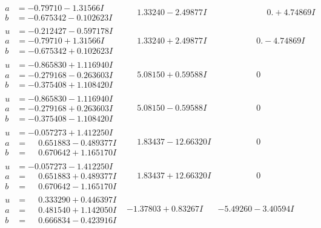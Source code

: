 \documentclass[1p]{elsarticle_modified}
\theoremstyle{definition}
\begin{document}
$$\begin{array}{c|c|c}
\begin{aligned}
a &= -0.79710 - 1.31566 I \\
b &= -0.675342 - 0.102623 I\end{aligned}
 & \phantom{-}1.33240 - 2.49877 I & \phantom{-0.000000 -}0. + 4.74869 I \\ \hline\begin{aligned}
u &= -0.212427 - 0.597178 I \\
a &= -0.79710 + 1.31566 I \\
b &= -0.675342 + 0.102623 I\end{aligned}
 & \phantom{-}1.33240 + 2.49877 I & \phantom{-0.000000 } 0. - 4.74869 I \\ \hline\begin{aligned}
u &= -0.865830 + 1.116940 I \\
a &= -0.279168 - 0.263603 I \\
b &= -0.375408 + 1.108420 I\end{aligned}
 & \phantom{-}5.08150 + 0.59588 I & \phantom{-0.000000 } 0 \\ \hline\begin{aligned}
u &= -0.865830 - 1.116940 I \\
a &= -0.279168 + 0.263603 I \\
b &= -0.375408 - 1.108420 I\end{aligned}
 & \phantom{-}5.08150 - 0.59588 I & \phantom{-0.000000 } 0 \\ \hline\begin{aligned}
u &= -0.057273 + 1.412250 I \\
a &= \phantom{-}0.651883 - 0.489377 I \\
b &= \phantom{-}0.670642 + 1.165170 I\end{aligned}
 & \phantom{-}1.83437 - 12.66320 I & \phantom{-0.000000 } 0 \\ \hline\begin{aligned}
u &= -0.057273 - 1.412250 I \\
a &= \phantom{-}0.651883 + 0.489377 I \\
b &= \phantom{-}0.670642 - 1.165170 I\end{aligned}
 & \phantom{-}1.83437 + 12.66320 I & \phantom{-0.000000 } 0 \\ \hline\begin{aligned}
u &= \phantom{-}0.333290 + 0.446397 I \\
a &= \phantom{-}0.481540 + 1.142050 I \\
b &= \phantom{-}0.666834 - 0.423916 I\end{aligned}
 & -1.37803 + 0.83267 I & -5.49260 - 3.40594 I \\ \hline\begin{aligned}

\end{aligned}
\end{array}$$
\end{document}
